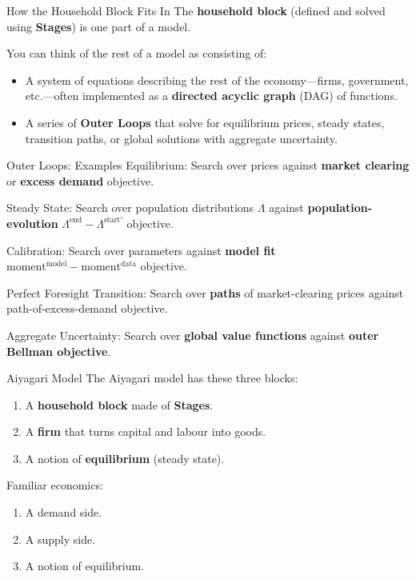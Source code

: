 \documentclass[10pt,aspectratio=169]{beamer}
\begin{document}
\begin{frame}{How the Household Block Fits In}
  The \textbf{household block} (defined and solved using \textbf{Stages}) is one part of a model.

  You can think of the rest of a model as consisting of:
  \begin{itemize}
    \item A system of equations describing the rest of the economy---firms, government, etc.---often implemented as a \textbf{directed acyclic graph} (DAG) of functions.
    \item A series of \textbf{Outer Loops} that solve for equilibrium prices, steady states, transition paths, or global solutions with aggregate uncertainty.
  \end{itemize}  
\end{frame}

\begin{frame}{Outer Loops: Examples}
  Equilibrium: Search over prices against \textbf{market clearing} or \textbf{excess demand} objective.

  Steady State: Search over population distributions $\Lambda$ against \textbf{population-evolution} $\Lambda^\text{end} - \Lambda^{\text{start}'}$ objective.

  Calibration: Search over parameters against \textbf{model fit} $\text{moment}^\text{model} - \text{moment}^\text{data}$ objective.

  Perfect Foresight Transition: Search over \textbf{paths} of market-clearing prices against path-of-excess-demand objective.

  Aggregate Uncertainty: Search over \textbf{global value functions} against \textbf{outer Bellman objective}.
\end{frame}

\begin{frame}{Aiyagari Model}
  The Aiyagari model has these three blocks:
  \begin{enumerate}
    \item A \textbf{household block} made of \textbf{Stages}.
    \item A \textbf{firm} that turns capital and labour into goods.
    \item A notion of \textbf{equilibrium} (steady state).
  \end{enumerate}

  Familiar economics:
  \begin{enumerate}
    \item A demand side.
    \item A supply side.
    \item A notion of equilibrium.
  \end{enumerate}
\end{frame}
\end{document}
